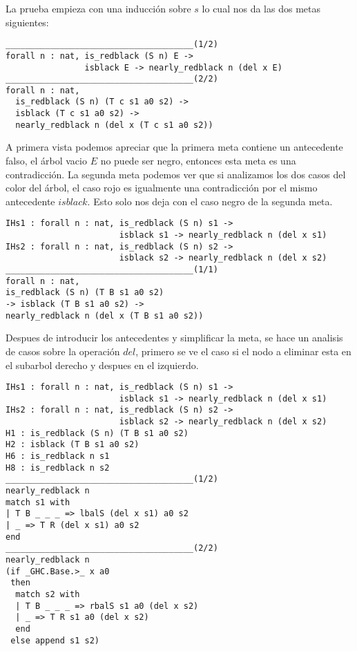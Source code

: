 La prueba empieza con una inducci\'on sobre $s$ lo cual nos da las dos metas siguientes:
\begin{verbatim}
______________________________________(1/2)
forall n : nat, is_redblack (S n) E ->
                isblack E -> nearly_redblack n (del x E)
______________________________________(2/2)
forall n : nat,
  is_redblack (S n) (T c s1 a0 s2) ->
  isblack (T c s1 a0 s2) ->
  nearly_redblack n (del x (T c s1 a0 s2))
\end{verbatim}

A primera vista podemos apreciar que la primera meta contiene un antecedente falso, el \'arbol
vacio $E$ no puede ser negro, entonces esta meta es una contradicci\'on. La segunda meta podemos
ver que si analizamos los dos casos del color del \'arbol, el caso rojo es igualmente una
contradicci\'on por el mismo antecedente $isblack$. Esto solo nos deja con el caso negro de la
segunda meta.

\begin{verbatim}
IHs1 : forall n : nat, is_redblack (S n) s1 ->
                       isblack s1 -> nearly_redblack n (del x s1)
IHs2 : forall n : nat, is_redblack (S n) s2 ->
                       isblack s2 -> nearly_redblack n (del x s2)
______________________________________(1/1)
forall n : nat,
is_redblack (S n) (T B s1 a0 s2)
-> isblack (T B s1 a0 s2) ->
nearly_redblack n (del x (T B s1 a0 s2))
\end{verbatim}

Despues de introducir los antecedentes y simplificar la meta, se hace un analisis de casos sobre la
operaci\'on $del$, primero se ve el caso si el nodo a eliminar esta en el subarbol derecho y
despues en el izquierdo.

\begin{verbatim}
IHs1 : forall n : nat, is_redblack (S n) s1 ->
                       isblack s1 -> nearly_redblack n (del x s1)
IHs2 : forall n : nat, is_redblack (S n) s2 ->
                       isblack s2 -> nearly_redblack n (del x s2)
H1 : is_redblack (S n) (T B s1 a0 s2)
H2 : isblack (T B s1 a0 s2)
H6 : is_redblack n s1
H8 : is_redblack n s2
______________________________________(1/2)
nearly_redblack n
match s1 with
| T B _ _ _ => lbalS (del x s1) a0 s2
| _ => T R (del x s1) a0 s2
end
______________________________________(2/2)
nearly_redblack n
(if _GHC.Base.>_ x a0
 then
  match s2 with
  | T B _ _ _ => rbalS s1 a0 (del x s2)
  | _ => T R s1 a0 (del x s2)
  end
 else append s1 s2)
\end{verbatim}

